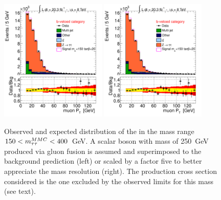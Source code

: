 \begin{figure}[tp]
  \centering
            \includegraphics[page=5, width=0.45\textwidth]{figure/final_plots/Bveto_final.pdf}
            \includegraphics[page=12, width=0.45\textwidth]{figure/final_plots/Bveto_final.pdf}
    \caption{ Observed and expected distribution of the \mmc in the mass range $150 < m_{\tau\tau}^{MMC} < 400 $~GeV. A scalar boson 
	with mass of 250~GeV produced via gluon fusion is assumed and  superimposed to the background prediction (left) 
	or scaled by a factor five to better appreciate the mass resolution (right). The production cross section considered is the one excluded
	by the observed limits for this mass (see text).}
	
\label{fig:excess}
\end{figure}



